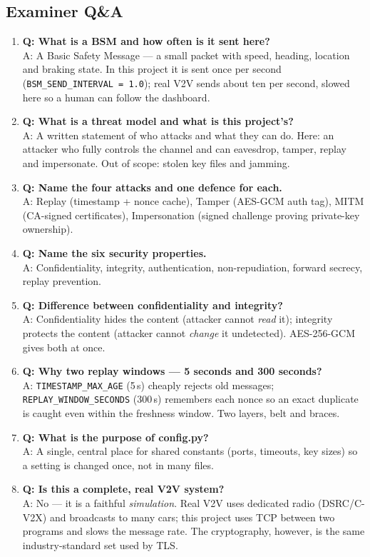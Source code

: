 \documentclass[11pt,a4paper]{article}
\begin{document}
\subsection{Examiner Q\&A}
\begin{enumerate}
  \item \textbf{Q: What is a BSM and how often is it sent here?}\\
        A: A Basic Safety Message --- a small packet with speed, heading,
        location and braking state. In this project it is sent once per second
        (\texttt{BSM\_SEND\_INTERVAL = 1.0}); real V2V sends about ten per
        second, slowed here so a human can follow the dashboard.
  \item \textbf{Q: What is a threat model and what is this project's?}\\
        A: A written statement of who attacks and what they can do. Here: an
        attacker who fully controls the channel and can eavesdrop, tamper,
        replay and impersonate. Out of scope: stolen key files and jamming.
  \item \textbf{Q: Name the four attacks and one defence for each.}\\
        A: Replay (timestamp + nonce cache), Tamper (AES-GCM auth tag), MITM
        (CA-signed certificates), Impersonation (signed challenge proving
        private-key ownership).
  \item \textbf{Q: Name the six security properties.}\\
        A: Confidentiality, integrity, authentication, non-repudiation, forward
        secrecy, replay prevention.
  \item \textbf{Q: Difference between confidentiality and integrity?}\\
        A: Confidentiality hides the content (attacker cannot \emph{read} it);
        integrity protects the content (attacker cannot \emph{change} it
        undetected). AES-256-GCM gives both at once.
  \item \textbf{Q: Why two replay windows --- 5 seconds and 300 seconds?}\\
        A: \texttt{TIMESTAMP\_MAX\_AGE} (5\,s) cheaply rejects old messages;
        \texttt{REPLAY\_WINDOW\_SECONDS} (300\,s) remembers each nonce so an
        exact duplicate is caught even within the freshness window. Two layers,
        belt and braces.
  \item \textbf{Q: What is the purpose of config.py?}\\
        A: A single, central place for shared constants (ports, timeouts, key
        sizes) so a setting is changed once, not in many files.
  \item \textbf{Q: Is this a complete, real V2V system?}\\
        A: No --- it is a faithful \emph{simulation}. Real V2V uses dedicated
        radio (DSRC/C-V2X) and broadcasts to many cars; this project uses TCP
        between two programs and slows the message rate. The cryptography,
        however, is the same industry-standard set used by TLS.
\end{enumerate}
\end{document}
